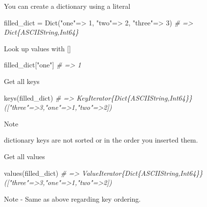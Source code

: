 \documentclass[ignorenonframetext,]{beamer}
\newenvironment{Shaded}{}{}
\newcommand{\DataTypeTok}[1]{\textcolor[rgb]{0.56,0.13,0.00}{{#1}}}
\newcommand{\FloatTok}[1]{\textcolor[rgb]{0.25,0.63,0.44}{{#1}}}
\newcommand{\StringTok}[1]{\textcolor[rgb]{0.25,0.44,0.63}{{#1}}}
\newcommand{\CommentTok}[1]{\textcolor[rgb]{0.38,0.63,0.69}{\textit{{#1}}}}
\newcommand{\NormalTok}[1]{{#1}}
\begin{document}
\begin{frame}[fragile]{You can create a dictionary using a literal}

\begin{Shaded}
\begin{Highlighting}[]
\NormalTok{filled_dict = }\DataTypeTok{Dict}\NormalTok{(}\StringTok{"one"}\NormalTok{=> }\FloatTok{1}\NormalTok{, }\StringTok{"two"}\NormalTok{=> }\FloatTok{2}\NormalTok{, }\StringTok{"three"}\NormalTok{=> }\FloatTok{3}\NormalTok{)}
\CommentTok{# => Dict\{ASCIIString,Int64\}}
\end{Highlighting}
\end{Shaded}

\end{frame}

\begin{frame}[fragile]{Look up values with {[}{]}}

\begin{Shaded}
\begin{Highlighting}[]
\NormalTok{filled_dict[}\StringTok{"one"}\NormalTok{] }\CommentTok{# => 1}
\end{Highlighting}
\end{Shaded}

\end{frame}

\begin{frame}[fragile]{Get all keys}

\begin{Shaded}
\begin{Highlighting}[]
\NormalTok{keys(filled_dict)}
\CommentTok{# => KeyIterator\{Dict\{ASCIIString,Int64\}\}(["three"=>3,"one"=>1,"two"=>2])}
\end{Highlighting}
\end{Shaded}

\end{frame}

\begin{frame}{Note}

dictionary keys are not sorted or in the order you inserted them.

\end{frame}

\begin{frame}[fragile]{Get all values}

\begin{Shaded}
\begin{Highlighting}[]
\NormalTok{values(filled_dict)}
\CommentTok{# => ValueIterator\{Dict\{ASCIIString,Int64\}\}(["three"=>3,"one"=>1,"two"=>2])}
\end{Highlighting}
\end{Shaded}

\begin{block}{Note - Same as above regarding key ordering.}

\end{block}

\end{frame}
\end{document}
